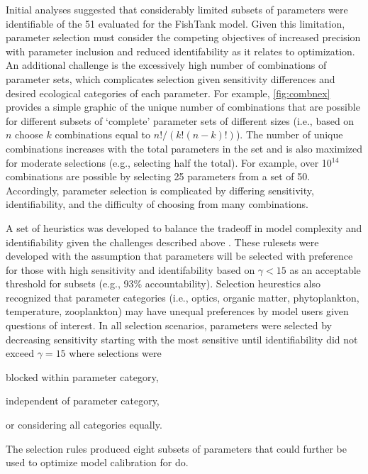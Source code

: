 \documentclass[letterpaper,12pt,oneside]{article}\usepackage[]{graphicx}\usepackage[]{color}
\begin{document}
Initial analyses suggested that considerably limited subsets of parameters were identifiable of the 51 evaluated for the FishTank model.  Given this limitation, parameter selection must consider the competing objectives of increased precision with parameter inclusion and reduced identifability as it relates to optimization.  An additional challenge is the excessively high number of combinations of parameter sets, which complicates selection given sensitivity differences and desired ecological categories of each parameter.  For example, \cref{fig:combnex} provides a simple graphic of the unique number of combinations that are possible for different subsets of `complete' parameter sets of different sizes (i.e., based on $n$ choose $k$ combinations equal to $n!/\left(k!\left(n-k\right)!\right)$).  The number of unique combinations increases with the total parameters in the set and is also maximized for moderate selections (e.g., selecting half the total).  For example, over 10$^{14}$ combinations are possible by selecting 25 parameters from a set of 50.  Accordingly, parameter selection is complicated by differing sensitivity, identifiability, and the difficulty of choosing from many combinations.

A set of heuristics was developed to balance the tradeoff in model complexity and identifiability given the challenges described above \citep[see also][]{Wagener01}.  These rulesets were developed with the assumption that parameters will be selected with preference for those with high sensitivity and identifability based on $\gamma < 15$ as an acceptable threshold for subsets (e.g., 93\% accountability).  Selection heurestics also recognized that parameter categories (i.e., optics, organic matter, phytoplankton, temperature, zooplankton) may have unequal preferences by model users given questions of interest.  In all selection scenarios, parameters were selected by decreasing sensitivity starting with the most sensitive until identifiability did not exceed $\gamma = 15$ where selections were \begin{inparaenum}[1\upshape)]
\item blocked within parameter category,
\item independent of parameter category,
\item or considering all categories equally.
\end{inparaenum} The selection rules produced eight subsets of parameters that could further be used to optimize model calibration for \ac{do}.
\end{document}
